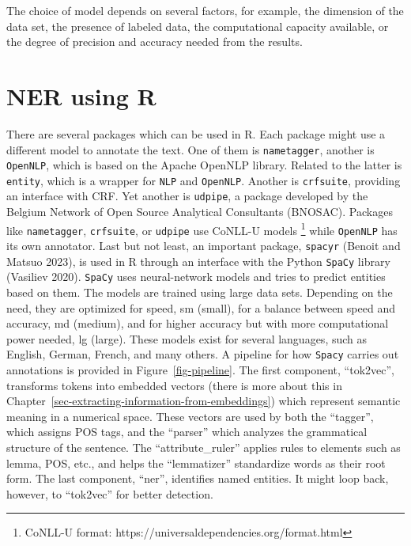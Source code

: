 The choice of model depends on several factors, for example, the
dimension of the data set, the presence of labeled data, the computational
capacity available, or the degree of precision and accuracy needed from the results.

\section{NER using R}\label{ner-using-r}

There are several packages which can be used in R. Each package might use
a different model to annotate the text. One of them is
\texttt{nametagger}, another is \texttt{OpenNLP}, which is based on the
Apache OpenNLP library. Related to the latter is \texttt{entity},
which is a wrapper for \texttt{NLP} and \texttt{OpenNLP}. Another is
\texttt{crfsuite}, providing an interface with CRF. Yet another
is \texttt{udpipe}, a package developed by the Belgium Network of Open
Source Analytical Consultants (BNOSAC). Packages like
\texttt{nametagger}, \texttt{crfsuite}, or \texttt{udpipe} use CoNLL-U
models \footnote{CoNLL-U format:
  https://universaldependencies.org/format.html} while \texttt{OpenNLP}
has its own annotator. Last but not least, an important package,
\texttt{spacyr} (Benoit and Matsuo 2023), is used in R through an
interface with the Python \texttt{SpaCy} library (Vasiliev 2020).
\texttt{SpaCy} uses neural-network models and tries to predict entities
based on them. The models are trained using large data sets.
Depending on the need, they are optimized for speed, sm (small), for a
balance between speed and accuracy, md (medium), and for higher accuracy
but with more computational power needed, lg (large). These models exist
for several languages, such as English, German, French, and many others. A
pipeline for how \texttt{Spacy} carries out annotations is provided in
Figure~\ref{fig-pipeline}. The first component, ``tok2vec'', transforms
tokens into embedded vectors (there is more about this in
Chapter~\ref{sec-extracting-information-from-embeddings}) which represent
semantic meaning in a numerical space. These vectors are used by both
the ``tagger'', which assigns POS tags, and the ``parser'' which analyzes
the grammatical structure of the sentence. The ``attribute\_ruler''
applies rules to elements such as lemma, POS, etc., and helps the
``lemmatizer'' standardize words as their root form. The last
component, ``ner'', identifies named entities. It might loop back,
however, to ``tok2vec'' for better detection.

